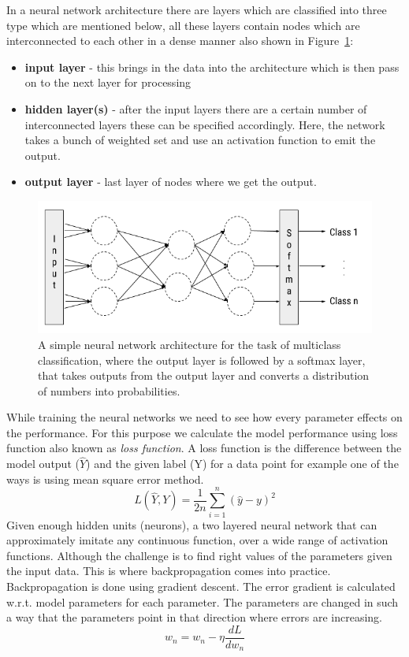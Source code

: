 In a neural network architecture there are layers which are classified into three type which are mentioned below, all these layers contain nodes which are interconnected to each other in a dense manner also shown in Figure~\ref{fig:nn}:
\begin{itemize}
    \item \textbf{input layer} - this brings in the data into the architecture which is then pass on to the next layer for processing
    \item \textbf{hidden layer(s)} - after the input layers there are a certain number of interconnected layers these can be specified accordingly. Here, the network takes a bunch of weighted set and use an activation function to emit the output.
    \item \textbf{output layer} - last layer of nodes where we get the output.
\end{itemize}
\begin{figure}[!htb]
    \centering
    \includegraphics[scale=0.6]{Figures/neural-network.png}
    \caption{A simple neural network architecture for the task of multiclass classification, where the output layer is followed by a softmax layer, that takes outputs from the output layer and converts a distribution of numbers into probabilities.}
    \label{fig:nn}
\end{figure}

While training the neural networks we need to see how every parameter effects on the performance. For this purpose we calculate the model performance using loss function also known as \emph{loss function}. A loss function is the difference between the model output ($\hat{Y}$) and the given label (Y) for a data point for example one of the ways is using mean square error method. 
\begin{equation}
    L(\hat{Y},Y) = \frac{1}{2n}\sum_{i=1}^{n}(\hat{y}-y)^2
\end{equation}
Given enough hidden units (neurons), a two layered neural network that can approximately imitate any continuous function, over a wide range of activation functions. Although the challenge is to find right values of the parameters given the input data. This is where backpropagation comes into practice. 
Backpropagation is done using gradient descent. The error gradient is calculated w.r.t. model parameters for each parameter. The parameters are changed in such a way that the parameters point in that direction where errors are increasing. 
\begin{equation}
    w_{n} = w_{n} - \eta\frac{dL}{dw_{n}}
    \label{eq:parameterupdate}
\end{equation}

